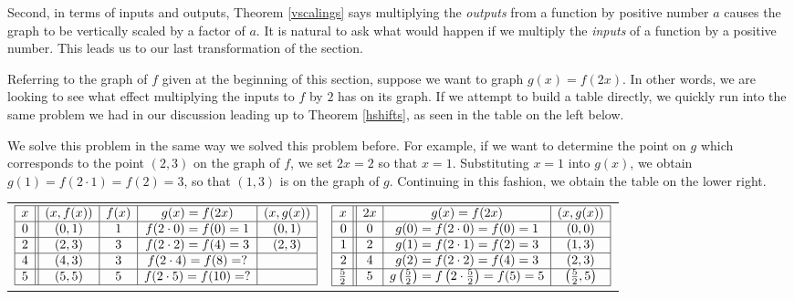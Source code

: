 \smallskip

Second, in terms of inputs and outputs, Theorem \ref{vscalings} says multiplying the \textit{outputs} from a function by positive number $a$ causes the graph to be vertically scaled by a factor of $a$.  It is natural to ask what would happen if we multiply the \textit{inputs} of a function by a positive number.  This leads us to our last transformation of the section.

\smallskip

Referring to the graph of $f$ given at the beginning of this section, suppose we want to graph $g(x) = f(2x)$.  In other words, we are looking to see what effect multiplying the inputs to $f$ by $2$ has on its graph.  If we attempt to build a table directly, we quickly run into the same problem we had in our discussion leading up to Theorem \ref{hshifts}, as seen in the table on the left below.  

\smallskip

We solve this problem in the same way we solved this problem before.  For example, if we want to determine the point on $g$ which corresponds to the point $(2,3)$ on the graph of $f$,  we set $2x =2 $ so that $x=1$.  Substituting $x=1$ into $g(x)$, we obtain $g(1) = f(2 \cdot 1) = f(2) = 3$, so that $(1,3)$ is on the graph of $g$. Continuing in this fashion, we obtain the table on the lower right.   

\smallskip

\begin{tabular}{cc}

$ \begin{array}{|c||c|c|c|c|}  

\hline

x & (x,f(x)) & f(x)& g(x)=f(2x) & (x, g(x)) \\ \hline
0  & (0,1)& 1 & f(2 \cdot 0) = f(0) = 1   &(0, 1) \\  \hline
2 & (2,3) & 3 & f(2\cdot2) = f(4) = 3  &(2,3) \\  \hline
4 & (4,3) & 3 &  f(2 \cdot 4) = f(8) = ? &  \\  \hline
5 & (5,5) & 5 & f(2 \cdot 5) = f(10) = ?  &  \\  \hline

\end{array} $ 

&

$ \begin{array}{|r||c|c|c|}  

\hline

x & 2x & g(x)=f(2x) & (x, g(x)) \\ \hline
0 & 0 & g(0)= f(2 \cdot 0) = f(0) = 1   &(0, 0) \\  \hline
1 &  2 &  g(1)=f(2 \cdot 1) = f(2)  = 3  &(1,3) \\  \hline
2 & 4  & g(2)=f(2 \cdot 2) = f(4) = 3 &  (2,3)\\  \hline
\frac{5}{2}  & 5 & g\left(\frac{5}{2}\right)=f\left(2 \cdot \frac{5}{2} \right) = f(5) = 5  & \left(\frac{5}{2},5\right) \\ [1pt] \hline

\end{array} $

\end{tabular} 

